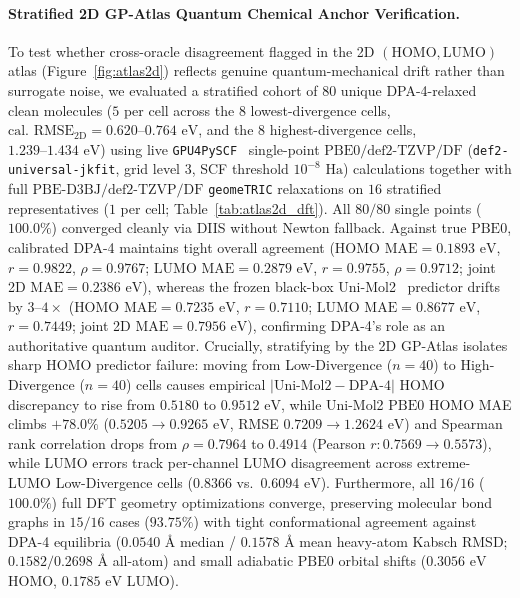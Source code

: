 \documentclass[11pt,a4paper]{article}
\begin{document}
\paragraph{Stratified 2D GP-Atlas Quantum Chemical Anchor Verification.}
To test whether cross-oracle disagreement flagged in the 2D $(\text{HOMO},\text{LUMO})$ atlas (Figure~\ref{fig:atlas2d}) reflects genuine quantum-mechanical drift rather than surrogate noise, we evaluated a stratified cohort of $80$ unique DPA-4-relaxed clean molecules ($5$ per cell across the $8$ lowest-divergence cells, $\text{cal.\ RMSE}_{2\text{D}} = 0.620\text{--}0.764\text{ eV}$, and the $8$ highest-divergence cells, $1.239\text{--}1.434\text{ eV}$) using live \texttt{GPU4PySCF}~\cite{sun2020pyscf,li2024gpu4pyscf} single-point $\text{PBE0/def2-TZVP/DF}$ (\texttt{def2-universal-jkfit}, grid level 3, SCF threshold $10^{-8}\text{ Ha}$) calculations together with full $\text{PBE-D3BJ/def2-TZVP/DF}$ \texttt{geomeTRIC} relaxations on $16$ stratified representatives ($1$ per cell; Table~\ref{tab:atlas2d_dft}). All $80/80$ single points ($100.0\%$) converged cleanly via DIIS without Newton fallback. Against true $\text{PBE0}$, calibrated DPA-4 maintains tight overall agreement ($\text{HOMO MAE}=0.1893\text{ eV}$, $r=0.9822$, $\rho=0.9767$; $\text{LUMO MAE}=0.2879\text{ eV}$, $r=0.9755$, $\rho=0.9712$; joint 2D $\text{MAE}=0.2386\text{ eV}$), whereas the frozen black-box Uni-Mol2~\cite{ji2024unimol2} predictor drifts by $3\text{--}4\times$ ($\text{HOMO MAE}=0.7235\text{ eV}$, $r=0.7110$; $\text{LUMO MAE}=0.8677\text{ eV}$, $r=0.7449$; joint 2D $\text{MAE}=0.7956\text{ eV}$), confirming DPA-4's role as an authoritative quantum auditor. Crucially, stratifying by the 2D GP-Atlas isolates sharp HOMO predictor failure: moving from Low-Divergence ($n=40$) to High-Divergence ($n=40$) cells causes empirical $|\text{Uni-Mol2}-\text{DPA-4}|$ HOMO discrepancy to rise from $0.5180$ to $0.9512\text{ eV}$, while Uni-Mol2 $\text{PBE0}$ HOMO MAE climbs $+78.0\%$ ($0.5205 \to 0.9265\text{ eV}$, RMSE $0.7209 \to 1.2624\text{ eV}$) and Spearman rank correlation drops from $\rho=0.7964$ to $0.4914$ (Pearson $r: 0.7569 \to 0.5573$), while LUMO errors track per-channel LUMO disagreement across extreme-LUMO Low-Divergence cells ($0.8366$ vs.\ $0.6094\text{ eV}$). Furthermore, all $16/16$ ($100.0\%$) full DFT geometry optimizations converge, preserving molecular bond graphs in $15/16$ cases ($93.75\%$) with tight conformational agreement against DPA-4 equilibria ($0.0540\text{ \AA}$ median / $0.1578\text{ \AA}$ mean heavy-atom Kabsch RMSD; $0.1582 / 0.2698\text{ \AA}$ all-atom) and small adiabatic $\text{PBE0}$ orbital shifts ($0.3056\text{ eV}$ HOMO, $0.1785\text{ eV}$ LUMO).
\end{document}
